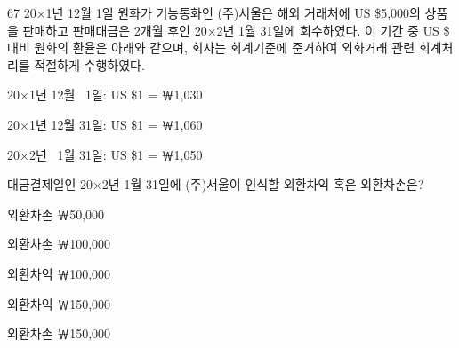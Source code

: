 \begin{question}{67}
20×1년 12월 1일 원화가 기능통화인 (주)서울은 해외 거래처에 US \$5,000의 상품을 판매하고 판매대금은 2개월 후인 20×2년 1월 31일에 회수하였다. 이 기간 중 US \$ 대비 원화의 환율은 아래와 같으며, 회사는 회계기준에 준거하여 외화거래 관련 회계처리를 적절하게 수행하였다.
\begin{framedtext}
\hspace*{3em}20×1년 12월 \ 1일: US \$1 = ￦1,030 \par
\hspace*{3em}20×1년 12월 31일: US \$1 = ￦1,060 \par
\hspace*{3em}20×2년 \ 1월 31일: US \$1 = ￦1,050 \par
\end{framedtext}
대금결제일인 20×2년 1월 31일에 (주)서울이 인식할 외환차익 혹은 외환차손은?
\begin{choices}
  \item 외환차손 ￦50,000
  \item 외환차손 ￦100,000
  \item 외환차익 ￦100,000
  \item 외환차익 ￦150,000
  \item 외환차손 ￦150,000
\end{choices}
\end{question}

